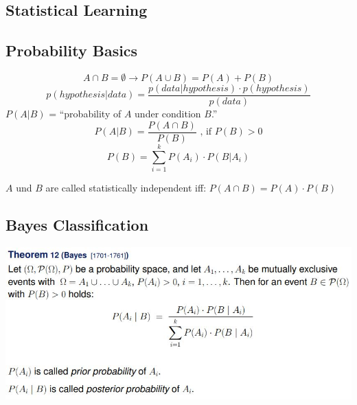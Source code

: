 \documentclass[11pt,a4paper]{article}
\begin{document}
\begin{flushleft}
\section{Statistical Learning}
\subsection{Probability Basics}
$$ A \cap B = \emptyset \rightarrow P(A \cup B) = P(A) + P(B) $$
$$ p(hypothesis | data ) = \dfrac{p(data | hypothesis ) \cdot p(hypothesis)}{p(data)} $$
$ P(A | B) $ = “probability of $A$ under condition $B$.”
$$ P(A | B ) = \dfrac{P(A \cap B)}{P(B)} \text{ , if } P(B)> 0 $$
$$ P(B) = \sum_{i = 1}^k P(A_i) \cdot P(B | A_i) $$ 

$A$ und $B$ are called statistically independent iff: $ P(A \cap B) = P(A) \cdot P(B) $

\subsection{Bayes Classification}
\includegraphics[width = \textwidth]{Bayes} 

\end{flushleft}
\end{document}
